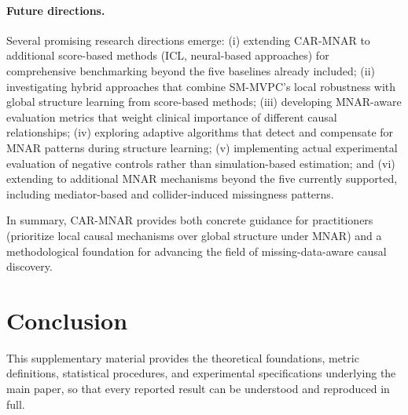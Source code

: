 \documentclass[runningheads]{llncs}
\begin{document}
\paragraph{Future directions.}
Several promising research directions emerge: (i) extending CAR-MNAR to additional score-based methods (ICL, neural-based approaches) for comprehensive benchmarking beyond the five baselines already included; (ii) investigating hybrid approaches that combine SM-MVPC's local robustness with global structure learning from score-based methods; (iii) developing MNAR-aware evaluation metrics that weight clinical importance of different causal relationships; (iv) exploring adaptive algorithms that detect and compensate for MNAR patterns during structure learning; (v) implementing actual experimental evaluation of negative controls rather than simulation-based estimation; and (vi) extending to additional MNAR mechanisms beyond the five currently supported, including mediator-based and collider-induced missingness patterns.

In summary, CAR-MNAR provides both concrete guidance for practitioners (prioritize local causal mechanisms over global structure under MNAR) and a methodological foundation for advancing the field of missing-data-aware causal discovery.

\section{Conclusion}

This supplementary material provides the theoretical foundations, metric definitions, statistical procedures, and experimental specifications underlying the main paper, so that every reported result can be understood and reproduced in full.




\end{document}
